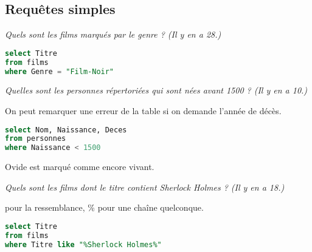 \subsection{Requêtes simples}
\begin{Exercise} \it 
Quels sont les films marqués par le genre  ? (Il y en a 28.)
\end{Exercise}
\begin{Answer}
\begin{lstlisting}[language=SQL]
select Titre
from films
where Genre = "Film-Noir"
\end{lstlisting}
\end{Answer}
\begin{Exercise} \it 
Quelles sont les personnes répertoriées qui sont nées avant 1500 ? (Il y en a 10.)

On peut remarquer une erreur de la table si on demande l'année de décès.
\end{Exercise}
\begin{Answer}
\begin{lstlisting}[language=SQL]
select Nom, Naissance, Deces
from personnes
where Naissance < 1500
\end{lstlisting}
Ovide est marqué comme encore vivant.
\end{Answer}
\begin{Exercise} \it Quels sont les films dont le titre contient Sherlock Holmes ? (Il y en a 18.)

 pour la ressemblance, \% pour une chaîne quelconque.
\end{Exercise}
\begin{Answer}
\begin{lstlisting}[language=SQL]
select Titre
from films
where Titre like "%Sherlock Holmes%"
\end{lstlisting}
\end{Answer}
